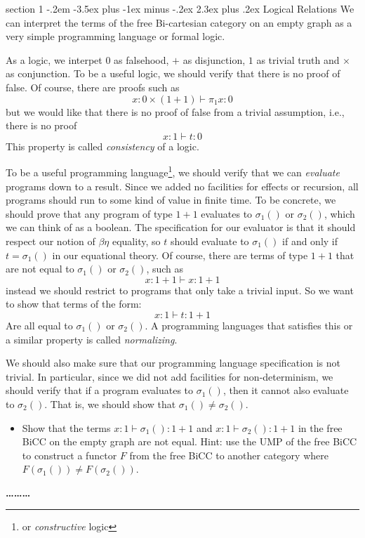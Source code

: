 \documentclass[12pt]{article}
\makeatletter
\newenvironment{problem}{\@startsection
       {section}
       {1}
       {-.2em}
       {-3.5ex plus -1ex minus -.2ex}
       {2.3ex plus .2ex}
       {\pagebreak[3]%
       \large\bf\noindent{Problem }
       }
       }
       {%
       \begin{center}\large\bf \ldots\ldots\ldots\end{center}}
\makeatother
\begin{document}
\begin{problem}{Logical Relations}
  We can interpret the terms of the free Bi-cartesian category on an
  empty graph as a very simple programming language or formal logic.

  As a logic, we interpet $0$ as falsehood, $+$ as disjunction, $1$ as
  trivial truth and $\times$ as conjunction. To be a useful logic, we
  should verify that there is no proof of false. Of course, there are
  proofs such as
  \[ x : 0 \times (1 + 1) \vdash \pi_1 x : 0 \]
  but we would like that there is no proof of false from a trivial
  assumption, i.e., there is no proof
  \[ x:1 \vdash t : 0 \]
  This property is called \emph{consistency} of a logic.

  To be a useful programming language\footnote{or \emph{constructive}
  logic}, we should verify that we can \emph{evaluate} programs down
  to a result. Since we added no facilities for effects or recursion,
  all programs should run to some kind of value in finite time. To be
  concrete, we should prove that any program of type $1 + 1$ evaluates
  to $\sigma_1()$ or $\sigma_2()$, which we can think of as a
  boolean. The specification for our evaluator is that it should
  respect our notion of $\beta\eta$ equality, so $t$ should evaluate
  to $\sigma_1()$ if and only if $t = \sigma_1()$ in our equational
  theory. Of course, there are terms of type $1 + 1$ that are not
  equal to $\sigma_1()$ or $\sigma_2()$, such as
  \[ x : 1 + 1 \vdash x : 1 + 1 \]
  instead we should restrict to programs that only take a trivial
  input. So we want to show that terms of the form:
  \[ x : 1 \vdash t : 1 + 1 \]
  Are all equal to $\sigma_1()$ or $\sigma_2()$.  A programming
  languages that satisfies this or a similar property is called
  \emph{normalizing}.

  We should also make sure that our programming language specification
  is not trivial. In particular, since we did not add facilities for
  non-determinism, we should verify that if a program evaluates to
  $\sigma_1()$, then it cannot also evaluate to $\sigma_2()$. That is,
  we should show that $\sigma_1() \neq \sigma_2()$.

  \begin{itemize}
  \item Show that the terms $x : 1 \vdash \sigma_1() : 1 + 1$ and
    $x:1\vdash \sigma_2() : 1 + 1$ in the free BiCC on the empty graph
    are not equal. Hint: use the UMP of the free BiCC to construct a
    functor $F$ from the free BiCC to another category where
    $F(\sigma_1()) \neq F(\sigma_2())$.
  \end{itemize}


\end{problem}
\end{document}
